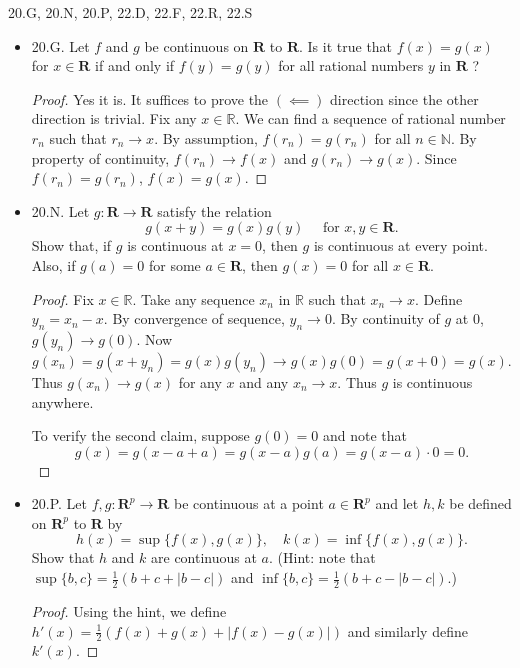 20.G, 20.N, 20.P, 22.D, 22.F, 22.R, 22.S
\begin{itemize}
	\item 20.G. Let $f$ and $g$ be continuous on $\boldsymbol{R}$ to $\boldsymbol{R}$. Is it true that $f(x)=g(x)$ for $x \in \boldsymbol{R}$ if and only if $f(y)=g(y)$ for all rational numbers $y$ in $\boldsymbol{R}$ ?
\begin{proof}
	Yes it is. It suffices to prove the $(\impliedby)$ direction since the other direction is trivial. Fix any $x \in \mathbb{R}$. We can find a sequence of rational number $r_n $ such that $r_n \to  x$. By assumption, $f(r_n) = g(r_n)$ for all $n \in \mathbb{N}$. By property of continuity, $f(r_n) \to f(x)$ and $g(r_n) \to g(x)$. Since $f(r_n) = g(r_n)$, $f(x) = g(x)$.
\end{proof}

	\item 20.N. Let $g: \boldsymbol{R} \rightarrow \boldsymbol{R}$ satisfy the relation
\[
g(x+y)=g(x) g(y) \quad \text { for } x, y \in \boldsymbol{R} .
\]
Show that, if $g$ is continuous at $x=0$, then $g$ is continuous at every point. Also, if $g(a)=0$ for some $a \in \boldsymbol{R}$, then $g(x)=0$ for all $x \in \boldsymbol{R}$.
\begin{proof}
	Fix  $x \in \mathbb{R}$. Take any sequence $x_n$ in $\mathbb{R}$ such that $x_n \to x$. Define $y_n = x_n - x$. 
	By convergence of sequence, $y_n \to  0$. By continuity of $g$ at $0$, $g(y_n) \to g(0)$. Now
	\[
		g(x_n) = g(x + y_n) = g(x) g(y_n) \to g(x)g(0) = g(x+0) = g(x)
	.\] 
	Thus $g(x_n) \to g(x)$ for any $x$ and any $x_n \to x$. Thus $g$ is continuous anywhere.

	To verify the second claim, suppose $g(0) = 0$ and note that
	\[
		g(x) = g(x-a+a) = g(x-a)g(a) = g(x-a) \cdot 0 = 0
	.\] 

\end{proof}

\item 20.P. Let $f, g: \boldsymbol{R}^p \rightarrow \boldsymbol{R}$ be continuous at a point $a \in \boldsymbol{R}^p$ and let $h, k$ be defined on $\boldsymbol{R}^p$ to $\boldsymbol{R}$ by
\[
h(x)=\sup \{f(x), g(x)\}, \quad k(x)=\inf \{f(x), g(x)\} .
\]
Show that $h$ and $k$ are continuous at $a$. (Hint: note that $\sup \{b, c\}=\frac{1}{2}(b+c+|b-c|)$ and $\inf \{b, c\}=\frac{1}{2}(b+c-|b-c|)$.)
\begin{proof}
	Using the hint, we define $h'(x) = \frac{1}{2}\left( f(x) + g(x) + \left| f(x) - g(x) \right|  \right) $ and similarly define $k'(x)$.


\end{proof}
\end{itemize}
